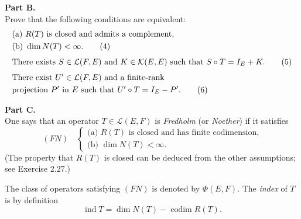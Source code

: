 \documentclass[12pt]{article}
\begin{document}
\noindent\textbf{Part B.}\\
Prove that the following conditions are equivalent:
\begin{align}
&\text{(a) } R(T) \text{ is closed and admits a complement,} \notag\\
&\text{(b) } \dim N(T) < \infty. \tag{4}\\[4pt]
&\text{There exists } S \in \mathcal{L}(F,E) \text{ and } K \in \mathcal{K}(E,E) \text{ such that }
S \circ T = I_E + K. \tag{5}\\[4pt]
&\text{There exist } U' \in \mathcal{L}(F,E) \text{ and a finite-rank} \notag\\
&\text{projection } P' \text{ in } E \text{ such that } U' \circ T = I_E - P'. \tag{6}
\end{align}
 
\noindent\textbf{Part C.}\\
One says that an operator $T \in \mathcal{L}(E,F)$ is \emph{Fredholm} (or \emph{Noether}) if it satisfies
\[
(FN)\quad
\begin{cases}
\text{(a) } R(T) \text{ is closed and has finite codimension,}\\
\text{(b) } \dim N(T) < \infty.
\end{cases}
\]
(The property that $R(T)$ is closed can be deduced from the other assumptions; see
Exercise 2.27.)
 
\medskip
 
\noindent The class of operators satisfying $(FN)$ is denoted by $\Phi(E,F)$. The \emph{index} of $T$ is
by definition
\[
\operatorname{ind} T = \dim N(T) - \operatorname{codim} R(T).
\]
 
\end{document}
